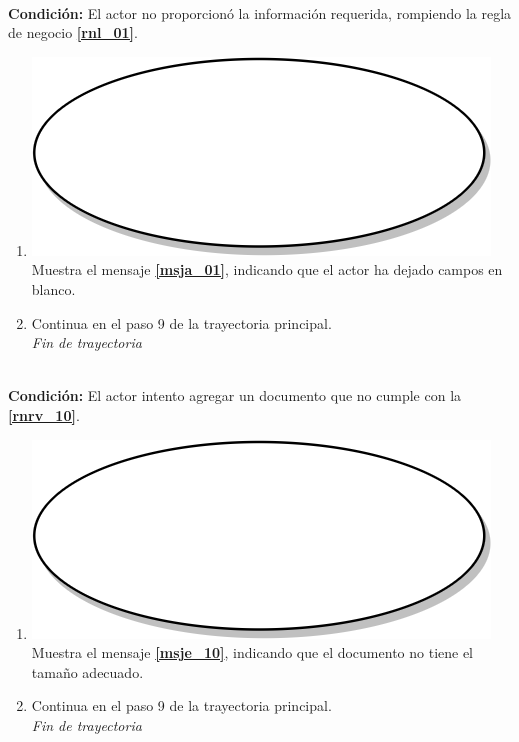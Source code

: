 \textbf{} \\
\textbf{Condición:} El actor no proporcionó la información requerida, rompiendo la regla de negocio \textbf{\ref{rnl_01}}.\\
 \begin{enumerate}[label=A\arabic*]
    \item {\includegraphics[scale=.05]{Capitulo3/img/proceso.png} Muestra el mensaje \textbf{\ref{msja_01}}, indicando que el actor ha dejado campos en blanco.}
    \item {Continua en el paso 9  de la trayectoria principal.} \\
    \textit{Fin de trayectoria} \\
\end{enumerate}

\textbf{} \\
\textbf{Condición:} El actor intento agregar un documento que no cumple con la \textbf{\ref{rnrv_10}}.\\
 \begin{enumerate}[label=B\arabic*]
    \item {\includegraphics[scale=.05]{Capitulo3/img/proceso.png} Muestra el mensaje \textbf{\ref{msje_10}}, indicando que el documento no tiene el tamaño adecuado.}
    \item {Continua en el paso 9 de la trayectoria principal.} \\
    \textit{Fin de trayectoria} \\
\end{enumerate}


